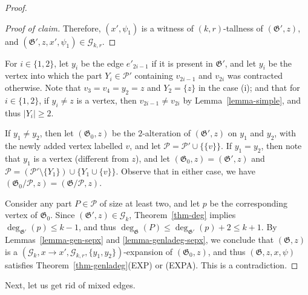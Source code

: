 \documentclass{article}
\newcommand{\PP}{\mathcal{P}}
\newcommand{\GG}{\mathcal{G}}
\newcommand\g{\mathfrak{G}}
\newenvironment{subproof}{%
  \renewcommand{\qedsymbol}{$\blacksquare$}%
  \begin{proof}[Proof of claim]%
}{%
  \end{proof}%
}
\begin{document}
\begin{proof}
\begin{subproof}
Therefore, $(x',\psi_1)$ is a witness of $(k,r)$-tallness of $(\g',z)$, and $(\g',z,x',\psi_1)\in \GG_{k,r}$.
\end{subproof}
For $i\in \{1,2\}$, let $y_i$ be the edge $e'_{2i-1}$ if it is present in $\g'$, and let $y_i$ be the vertex
into which the part $Y_i\in\PP'$ containing $v_{2i-1}$ and $v_{2i}$ was contracted otherwise.  Note that
$v_3=v_4=y_2=z$ and $Y_2=\{z\}$ in the case (i); and that for $i\in\{1,2\}$, if $y_i\neq z$ is a vertex,
then $v_{2i-1}\neq v_{2i}$ by Lemma~\ref{lemma-simple}, and thus $|Y_i|\ge 2$.

If $y_1\neq y_2$, then let $(\g_0,z)$ be the $2$-alteration of $(\g',z)$ on $y_1$ and $y_2$, with the newly added vertex labelled $v$,
and let $\PP=\PP'\cup\{\{v\}\}$.
If $y_1=y_2$, then note that $y_1$ is a vertex (different from $z$), and let $(\g_0,z)=(\g',z)$ and $\PP=(\PP'\setminus\{Y_1\})\cup\{Y_1\cup \{v\}\}$.
Observe that in either case, we have $(\g_0/\PP,z)=(\g/\PP,z)$.

Consider any part $P\in\PP$ of size at least two, and let $p$ be the corresponding vertex of $\g_0$.
Since $(\g',z)\in \GG_k$, Theorem~\ref{thm-deg} implies $\deg_{\g'}(p)\le k-1$, and thus $\deg_{\g}(P)\le \deg_{\g'}(p)+2\le k+1$.
By Lemmas~\ref{lemma-gen-sepx} and \ref{lemma-genladeg-sepx}, we conclude that
$(\g,z)$ is a $(\GG_k,x\to x',\GG_{k,r},\{y_1,y_2\})$-expansion of $(\g_0,z)$, and thus $(\g,z,x,\psi)$ satisfies Theorem~\ref{thm-genladeg}(EXP) or (EXPA).
This is a contradiction.
\end{proof}

Next, let us get rid of mixed edges.
\end{document}
